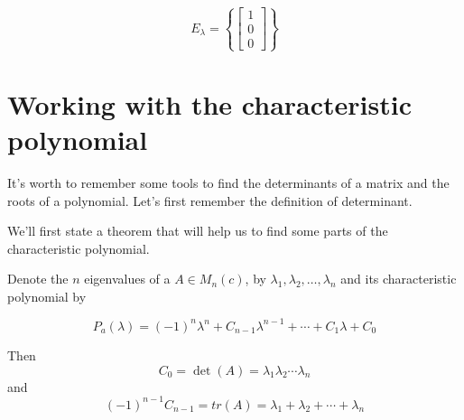 \documentclass{report}
\begin{document}
    $$ E_\lambda = \left\{ \begin{bmatrix}1\\0\\0\end{bmatrix} \right\}$$

    \section{Working with the characteristic polynomial}
    It's worth to remember some tools to find the determinants of a matrix and the roots of a polynomial. Let's first remember the definition of determinant.

    We'll first state a theorem that will help us to find some parts of the characteristic polynomial.

    \begin{thBox}
        Denote the $n$ eigenvalues of a $A \in M_n(c)$, by $\lambda_1, \lambda_2, \dots , \lambda_n$ and its characteristic polynomial by

        $$P_a(\lambda) = (-1)^n\lambda^n + C_{n-1}\lambda^{n-1} + \cdots + C_1\lambda + C_0$$

        Then $$C_0 = \det(A) = \lambda_1 \lambda_2 \cdots \lambda_n$$ and $$(-1)^{n-1}C_{n-1} = tr(A) = \lambda_1 + \lambda_2 + \cdots + \lambda_n$$
    \end{thBox}
\end{document}
